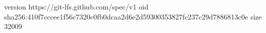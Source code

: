 version https://git-lfs.github.com/spec/v1
oid sha256:410f7cccee1f56c7320c0fb0dcaa2d6e2d59300353827fc237c29d7886813c0e
size 32009
